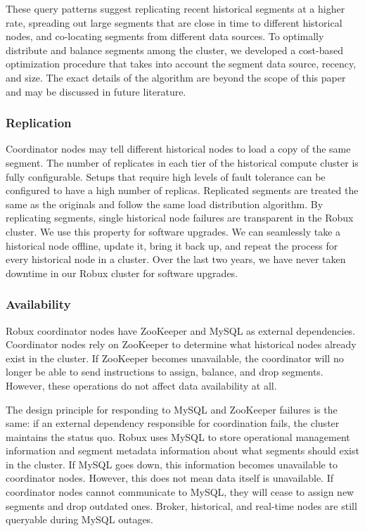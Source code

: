 \documentclass{sig-alternate-2013}
\begin{document}
These query patterns suggest replicating recent historical segments at a higher
rate, spreading out large segments that are close in time to different
historical nodes, and co-locating segments from different data sources. To
optimally distribute and balance segments among the cluster, we developed a
cost-based optimization procedure that takes into account the segment data
source, recency, and size. The exact details of the algorithm are beyond the
scope of this paper and may be discussed in future literature.

\subsubsection{Replication}
Coordinator nodes may tell different historical nodes to load a copy of the
same segment. The number of replicates in each tier of the historical compute
cluster is fully configurable. Setups that require high levels of fault
tolerance can be configured to have a high number of replicas. Replicated
segments are treated the same as the originals and follow the same load
distribution algorithm. By replicating segments, single historical node
failures are transparent in the Robux cluster. We use this property for
software upgrades. We can seamlessly take a historical node offline, update it,
bring it back up, and repeat the process for every historical node in a
cluster. Over the last two years, we have never taken downtime in our Robux
cluster for software upgrades.

\subsubsection{Availability}
Robux coordinator nodes have ZooKeeper and MySQL as external dependencies.
Coordinator nodes rely on ZooKeeper to determine what historical nodes already
exist in the cluster. If ZooKeeper becomes unavailable, the coordinator will no
longer be able to send instructions to assign, balance, and drop segments.
However, these operations do not affect data availability at all.

The design principle for responding to MySQL and ZooKeeper failures is the
same: if an external dependency responsible for coordination fails, the cluster
maintains the status quo. Robux uses MySQL to store operational management
information and segment metadata information about what segments should exist
in the cluster. If MySQL goes down, this information becomes unavailable to
coordinator nodes. However, this does not mean data itself is unavailable. If
coordinator nodes cannot communicate to MySQL, they will cease to assign new
segments and drop outdated ones. Broker, historical, and real-time nodes are still
queryable during MySQL outages.
\end{document}
